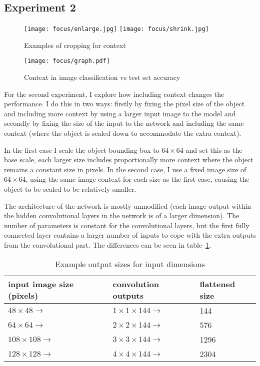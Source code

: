 \subsection {Experiment 2}

\begin{figure}[t]
\centering
\texttt{[image: focus/enlarge.jpg]}
\texttt{[image: focus/shrink.jpg]}
\label{fig:focus_context}
\caption{Examples of cropping for context}

\end{figure}


\begin{figure}[h]
\centering
\texttt{[image: focus/graph.pdf]}
\caption{Context in image classification vs test set accuracy}
\label{fig:focus_exp2}
\end{figure}

For the second experiment, I explore how including context changes the performance. I do this in two ways: firstly by fixing the pixel size of the object and including more context by using a larger input image to the model and secondly by fixing the size of the input to the network and including the same context (where the object is scaled down to accommodate the extra context).

In the first case I scale the object bounding box to $ 64 \times 64 $ and set this as the base scale, each larger size includes proportionally more context where the object remains a constant size in pixels. In the second case, I use a fixed image size of $ 64 \times 64 $, using the same image context for each size as the first case, causing the object to be scaled to be relatively smaller. 

The architecture of the network is mostly unmodified (each image output within the hidden convolutional layers in the network is of a larger dimension). The number of parameters is constant for the convolutional layers, but the first fully connected layer contains a larger number of inputs to cope with the extra outputs from the convolutional part. The differences can be seen in table~\ref{fig:focus_sizes}.


\begin{table}[h]
  \centering
    \caption{Example output sizes for input dimensions }
\begin{tabular}{ l l l } 
 
 input image size (pixels) & convolution outputs & flattened size \\
 \toprule
 
 $ 48 \times 48  \rightarrow $ & $ 1\times1\times144 \rightarrow $ & 144 \\
 $ 64 \times 64  \rightarrow $ & $ 2\times2\times144 \rightarrow $ & 576 \\
 $ 108 \times 108  \rightarrow $ & $ 3\times3\times144 \rightarrow $ & 1296 \\
 $ 128 \times 128  \rightarrow $ & $ 4\times4\times144 \rightarrow $ & 2304 \\
 
\end{tabular}
\label{fig:focus_sizes}
\end{table}

